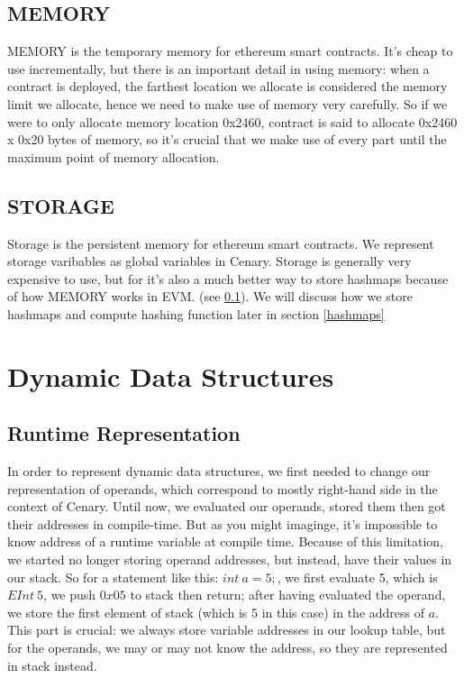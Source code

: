 \documentclass{article}
\begin{document}
\subsection{MEMORY}
\label{memory}
MEMORY is the temporary memory for ethereum smart contracts. It's cheap to use incrementally, but there is an important detail in using memory: when a contract is deployed, the farthest location we allocate is considered the memory limit we allocate, hence we need to make use of memory very carefully. So if we were to only allocate memory location 0x2460, contract is said to allocate 0x2460 x 0x20 bytes of memory, so it's crucial that we make use of every part until the maximum point of memory allocation.
\subsection{STORAGE}
Storage is the persistent memory for ethereum smart contracts. We represent storage varibables as global variables in Cenary. Storage is generally very expensive to use, but for it's also a much better way to store hashmaps because of how MEMORY works in EVM. (see \ref{memory}). We will discuss how we store hashmaps and compute hashing function later in section \ref{hashmaps}

\section{Dynamic Data Structures}
\subsection{Runtime Representation}
\label{runtime-rep}
In order to represent dynamic data structures, we first needed to change our representation of operands, which correspond to mostly right-hand side in the context of Cenary. Until now, we evaluated our operands, stored them then got their addresses in compile-time. But as you might imaginge, it's impossible to know address of a runtime variable at compile time. Because of this limitation, we started no longer storing operand addresses, but instead, have their values in our stack. So for a statement like this: $int\ a = 5;$, we first evaluate 5, which is $EInt\ 5$, we push $0x05$ to stack then return; after having evaluated the operand, we store the first element of stack (which is 5 in this case) in the address of $a$. This part is crucial: we always store variable addresses in our lookup table, but for the operands, we may or may not know the address, so they are represented in stack instead.
\end{document}
